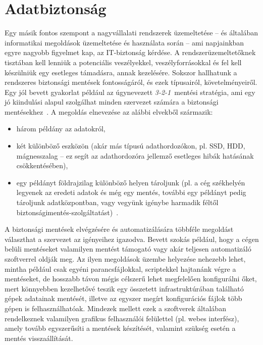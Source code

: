 \section{Adatbiztonság}
\label{sect:datasec}
Egy másik fontos szempont a nagyvállalati rendszerek üzemeltetése -- és általában informatikai megoldások üzemeltetése és használata során -- ami napjainkban egyre nagyobb figyelmet kap, az IT-biztonság kérdése. A rendszerüzemeltetőknek tisztában kell lenniük a potenciális veszélyekkel, veszélyforrásokkal és fel kell készülniük egy esetleges támadásra, annak kezelésére. Sokszor hallhatunk a rendszeres biztonsági mentések fontosságáról, és ezek típusairól, követelményeiről. Egy jól bevett gyakorlat például az úgynevezett \textit{\mbox{3-2-1}}~mentési stratégia, ami egy jó kiindulási alapul szolgálhat minden szervezet számára a biztonsági mentésekhez~\cite{Backblaze321}.
A megoldás elnevezése az alábbi elvekből származik:
\begin{itemize}
	\item három példány az adatokról,
	\item két különböző eszközön (akár más típusú adathordozókon, pl. SSD, HDD, mágnesszalag -- ez segít az adathordozóra jellemző esetleges hibák hatásának csökkentésében),
	\item egy példányt földrajzilag különböző helyen tároljunk (pl. a cég székhelyén legyenek az eredeti adatok és még egy mentés, további egy példányt pedig tároljunk adatközpontban, vagy vegyünk igénybe harmadik féltől biztonságimentés-szolgáltatást)~\cite{Seagate321}.
\end{itemize}

A biztonsági mentések elvégzésére és automatizálására többféle megoldást választhat a szervezet az igényeihez igazodva. Bevett szokás például, hogy a cégen belüli mentéseket valamilyen mentést támogató vagy akár teljesen automatizáló szoftverrel oldják meg. Az ilyen megoldások üzembe helyezése nehezebb lehet, mintha például csak egyéni parancsfájlokkal, scriptekkel hajtanánk végre a mentéseket, de hosszabb távon mégis célszerű lehet megfelelően konfigurálni őket, mert könnyebben kezelhetővé teszik egy összetett infrastruktúrában található gépek adatainak mentését, illetve az egyszer megírt konfigurációs fájlok több gépen is felhasználhatóak. Mindezek mellett ezek a szoftverek általában rendelkeznek valamilyen grafikus felhasználói felülettel (pl. webes interfész), amely tovább egyszerűsíti a mentések készítését, valamint szükség esetén a mentés visszaállítását.



